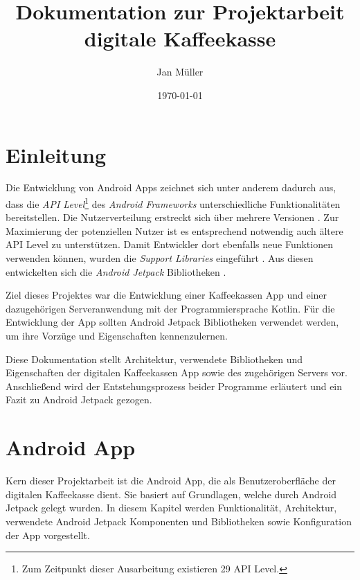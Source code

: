 \documentclass[a4paper, 11pt]{article}
\title{Dokumentation zur Projektarbeit digitale Kaffeekasse}
\author{Jan Müller}
\date{\today}
\begin{document}
\maketitle

\section{Einleitung}
\label{sec:intro}
Die Entwicklung von Android Apps zeichnet sich unter anderem dadurch aus, dass die \textit{API Level}\footnote{Zum Zeitpunkt dieser Ausarbeitung existieren 29 API Level.} des \textit{Android Frameworks} unterschiedliche Funktionalitäten bereitstellen.
Die Nutzerverteilung erstreckt sich über mehrere Versionen \autocite{androidhistory}.
Zur Maximierung der potenziellen Nutzer ist es entsprechend notwendig auch ältere API Level zu unterstützen.
Damit Entwickler dort ebenfalls neue Funktionen verwenden können, wurden die \textit{Support Libraries} eingeführt \autocite{supportlibraries}.
Aus diesen entwickelten sich die \textit{Android Jetpack} Bibliotheken \autocite{androidjetpack}.

Ziel dieses Projektes war die Entwicklung einer Kaffeekassen App und einer dazugehörigen Serveranwendung mit der Programmiersprache Kotlin.
Für die Entwicklung der App sollten Android Jetpack Bibliotheken verwendet werden, um ihre Vorzüge und Eigenschaften kennenzulernen.

Diese Dokumentation stellt Architektur, verwendete Bibliotheken und Eigenschaften der digitalen Kaffeekassen App sowie des zugehörigen Servers vor.
Anschließend wird der Entstehungsprozess beider Programme erläutert und ein Fazit zu Android Jetpack gezogen.

\section{Android App}
\label{sec:app}
Kern dieser Projektarbeit ist die Android App, die als Benutzeroberfläche der digitalen Kaffeekasse dient.
Sie basiert auf Grundlagen, welche durch Android Jetpack gelegt wurden.
In diesem Kapitel werden Funktionalität, Architektur, verwendete Android Jetpack Komponenten und Bibliotheken sowie Konfiguration der App vorgestellt.
\end{document}
